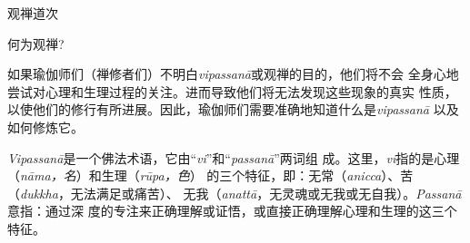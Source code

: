 


\beginchapter 观禅道次


\subsectnon \1何为观禅?

如果瑜伽师们（禅修者们）不明白{\it vipassan\=a\/}或观禅的目的，他们将不会
全身心地尝试对心理和生理过程的关注。进而导致他们将无法发现这些现象的真实
性质，以使他们的修行有所进展。因此，瑜伽师们需要准确地知道什么是{\it vipassan\=a}\1
以及如何修炼它。

{\it Vipassan\=a}是一个佛法术语，它由“{\it vi}”和“{\it passan\=a}”两词组
成。这里，{\it vi}指的是心理（{\it n\=ama，名}）和生理（{\it r\=upa，色}）
的三个特征，即：无常（{\it anicca}）、苦（{\it dukkha}，无法满足或痛苦）、
无我（{\it anatt\=a}，无灵魂或无我或无自我）。{\it Passan\=a}意指：通过深
度的专注来正确理解或证悟，或直接正确理解心理和生理的这三个特征。

\endchapter

\byebye
